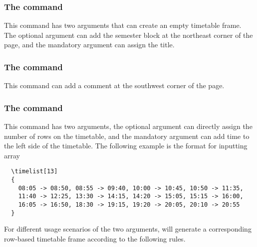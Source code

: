 \documentclass[letterpaper]{l3doc}
\newenvironment{example}{\begin{list}{}{\leftmargin=\parindent}\item }{\end{list}}
\begin{document}
\subsubsection{The  command}

\begin{example}
  \qquad
\end{example}

This command has two arguments that can create an empty timetable frame. The optional argument can add the semester block at the northeast corner of the page, and the mandatory argument can assign the title.

\subsubsection{The  command}

\begin{example}
\end{example}

This command can add a comment at the southwest corner of the page.

\subsubsection{The  command}

\begin{example}
  \qquad
\end{example}

This command has two arguments, the optional argument can directly assign the number of rows on the timetable, and the mandatory argument can add time to the left side of the timetable. The following example is the format for inputting array

\begin{Verbatim}
  \timelist[13]
  {
    08:05 -> 08:50, 08:55 -> 09:40, 10:00 -> 10:45, 10:50 -> 11:35,
    11:40 -> 12:25, 13:30 -> 14:15, 14:20 -> 15:05, 15:15 -> 16:00,
    16:05 -> 16:50, 18:30 -> 19:15, 19:20 -> 20:05, 20:10 -> 20:55
  }
\end{Verbatim}

For different usage scenarios of the two arguments,  will generate a corresponding row-based timetable frame according to the following rules.
\end{document}
